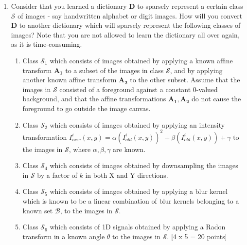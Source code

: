 \documentclass[11pt]{article}
\begin{document}
\begin{enumerate}
\item Consider that you learned a dictionary $\boldsymbol{D}$ to sparsely represent a certain class $\mathcal{S}$ of images - say handwritten alphabet or digit images. How will you convert $\boldsymbol{D}$ to another dictionary which will sparsely represent the following classes of images? Note that you are not allowed to learn the dictionary all over again, as it is time-consuming. 
\begin{enumerate}
\item Class $\mathcal{S}_1$ which consists of images obtained by applying a known affine transform $\boldsymbol{A_1}$ to a subset of the images in class $\mathcal{S}$, and by applying another known affine transform $\boldsymbol{A_2}$ to the other subset. Assume that the images in $\mathcal{S}$ consisted of a foreground against a constant 0-valued background, and that the affine transformations $\boldsymbol{A_1}, \boldsymbol{A_2}$ do not cause the foreground to go outside the image canvas. 
\item Class $\mathcal{S}_2$ which consists of images obtained by applying an intensity transformation $I^i_{new}(x,y) = \alpha (I^i_{old}(x,y))^2 + \beta (I^i_{old}(x,y)) + \gamma$ to the images in $\mathcal{S}$, where $\alpha,\beta,\gamma$ are known.  
\item Class $\mathcal{S}_4$ which consists of images obtained by downsampling the images in $\mathcal{S}$ by a factor of $k$ in both X and Y directions. 
\item Class $\mathcal{S}_5$ which consists of images obtained by applying a blur kernel which is known to be a linear combination of blur kernels belonging to a known set $\mathcal{B}$, to the images in $\mathcal{S}$. 
\item Class $\mathcal{S}_6$ which consists of 1D signals obtained by applying a Radon transform in a known angle $\theta$ to the images in $\mathcal{S}$. 
\textsf{[4 x 5 = 20 points]}
\end{enumerate}


\end{enumerate}
\end{document}
